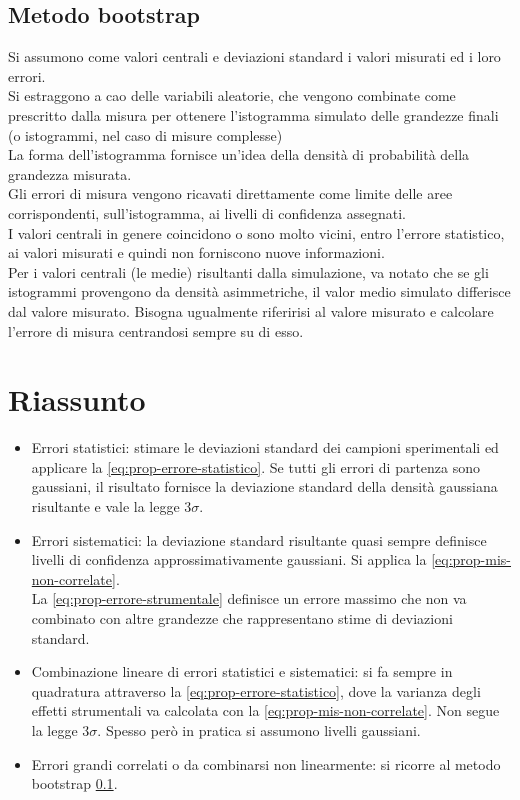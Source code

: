 \subsection{Metodo bootstrap} %
\label{subsec:metodo-bootstrap}
Si assumono come valori centrali e deviazioni standard i valori misurati ed i loro errori. \\ Si estraggono a cao delle variabili aleatorie, che vengono combinate come prescritto dalla misura per ottenere l'istogramma simulato delle grandezze finali (o istogrammi, nel caso di misure complesse) \\ La forma dell'istogramma fornisce un'idea della densità di probabilità della grandezza misurata. \\ Gli errori di misura vengono ricavati direttamente come limite delle aree corrispondenti, sull'istogramma, ai livelli di confidenza assegnati. \\ I valori centrali in genere coincidono o sono molto vicini, entro l'errore statistico, ai valori misurati e quindi non forniscono nuove informazioni. \\ Per i valori centrali (le medie) risultanti dalla simulazione, va notato che se gli istogrammi provengono da densità asimmetriche, il valor medio simulato differisce dal valore misurato. Bisogna ugualmente riferirisi al valore misurato e calcolare l'errore di misura centrandosi sempre su di esso.

\section{Riassunto} %
\label{sec:riassunto-propagazione errori}
\begin{itemize}
\item Errori statistici: stimare le deviazioni standard dei campioni sperimentali ed applicare la \ref{eq:prop-errore-statistico}. Se tutti gli errori di partenza sono gaussiani, il risultato fornisce la deviazione standard della densità gaussiana risultante e vale la legge $3\sigma$.
\item Errori sistematici: la deviazione standard risultante quasi sempre definisce livelli di confidenza approssimativamente gaussiani. Si applica la \ref{eq:prop-mis-non-correlate}. \\ La \ref{eq:prop-errore-strumentale} definisce un errore massimo che non va combinato con altre grandezze che rappresentano stime di deviazioni standard.
\item Combinazione lineare di errori statistici e sistematici: si fa sempre in quadratura attraverso la \ref{eq:prop-errore-statistico}, dove la varianza degli effetti strumentali va calcolata con la \ref{eq:prop-mis-non-correlate}. Non segue la legge $3\sigma$. Spesso però in pratica si assumono livelli gaussiani.
\item Errori grandi correlati o da combinarsi non linearmente: si ricorre al metodo bootstrap \ref{subsec:metodo-bootstrap}.
\end{itemize}

